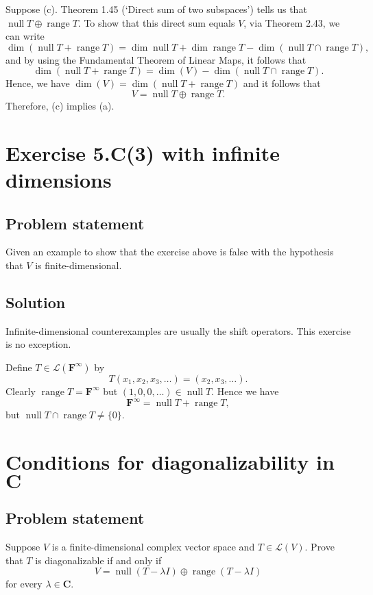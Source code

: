 \documentclass{article}
\begin{document}
Suppose (c). 
Theorem 1.45 (`Direct sum of two subspaces') tells us that $\operatorname{null}T\oplus\operatorname{range}T$. 
To show that this direct sum equals $V$, via Theorem 2.43, we can write
\[\dim(\operatorname{null}T+\operatorname{range}T)=\dim\operatorname{null}T+\dim\operatorname{range}T-\dim(\operatorname{null}T\cap \operatorname{range}T),\]
and by using the Fundamental Theorem of Linear Maps, it follows that
\[\dim(\operatorname{null}T+\operatorname{range}T)=\dim(V)-\dim(\operatorname{null}T\cap \operatorname{range}T).\]
Hence, we have $\dim(V)=\dim(\operatorname{null}T+\operatorname{range}T)$ and it follows that 
\[V=\operatorname{null}T\oplus\operatorname{range}T.\]
Therefore, (c) implies (a).

\clearpage

\section{Exercise 5.C(3) with infinite dimensions}
\subsection*{Problem statement}
Given an example to show that the exercise above is false with the hypothesis that $V$ is finite-dimensional.

\subsection*{Solution}
Infinite-dimensional counterexamples are usually the shift operators. 
This exercise is no exception.

Define $T\in\mathcal{L}(\mathbf{F}^\infty)$ by
\[T(x_1,x_2,x_3,\ldots)=(x_2,x_3,\ldots).\]
Clearly $\operatorname{range}T=\mathbf{F}^\infty$ but $(1,0,0,\ldots)\in\operatorname{null}T$. 
Hence we have
\[\mathbf{F}^\infty=\operatorname{null}T+\operatorname{range}T,\]
but $\operatorname{null}T\cap \operatorname{range}T\neq \{0\}.$

\clearpage

\section{Conditions for diagonalizability in $\mathbf{C}$}
\subsection*{Problem statement}
Suppose $V$ is a finite-dimensional complex vector space and $T\in\mathcal{L}(V)$. 
Prove that $T$ is diagonalizable if and only if 
\[V=\operatorname{null}(T-\lambda I)\oplus\operatorname{range}(T-\lambda I)\]
for every $\lambda\in\mathbf{C}$.
\end{document}
